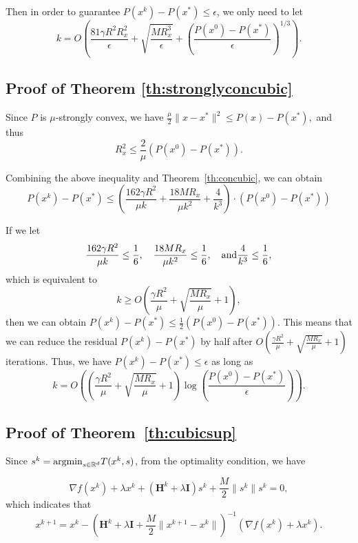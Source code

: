 \documentclass[10pt]{article}
\newcommand{\R}{\mathbb{R}}
\newcommand{\mH}{\mathbf{H}}
\newcommand{\mI}{\mathbf{I}}
\begin{document}
Then in order to guarantee $P(x^k) - P(x^*) \leq \epsilon$, we only need to let 
$$
k = O\left( \frac{81\gamma R^2 R_x^2}{\epsilon}  + \sqrt{\frac{MR_x^3}{\epsilon}} + \left(  \frac{P(x^0) - P(x^*)}{\epsilon}  \right)^{1/3}   \right). 
$$


\subsection{Proof of Theorem \ref{th:stronglyconcubic}}

Since $P$ is $\mu$-strongly convex, we have 
$
\frac{\mu}{2} \|x-x^*\|^2 \leq P(x) - P(x^*), 
$
and thus 
$$
R_x^2 \leq \frac{2}{\mu} (P(x^0) - P(x^*)). 
$$

Combining the above inequality and Theorem~\ref{th:concubic}, we can obtain 
$$
P(x^k) - P(x^*) \leq \left(  \frac{162\gamma R^2}{\mu k} +  \frac{18MR_x}{\mu k^2} + \frac{4}{ k^3}  \right) \cdot \left(  P(x^0) - P(x^*)  \right)
$$

If we let 
$$
\frac{162\gamma R^2}{\mu k} \leq \frac{1}{6}, \quad  \frac{18MR_x}{\mu k^2} \leq \frac{1}{6}, \quad {\rm and} \frac{4}{ k^3}  \leq \frac{1}{6}, 
$$
which is equivalent to 
$$
k \geq O\left(  \frac{\gamma R^2}{\mu} + \sqrt{\frac{MR_x}{\mu}} + 1 \right), 
$$
then we can obtain $P(x^k) - P(x^*) \leq \frac{1}{2} (P(x^0) - P(x^*))$. This means that we can reduce the residual $P(x^k)-P(x^*)$ by half after $O\left(  \frac{\gamma R^2}{\mu} + \sqrt{\frac{MR_x}{\mu}} + 1 \right)$ iterations. Thus, we have $P(x^k) - P(x^*) \leq \epsilon$ as long as 
$$
k = O\left( \left(  \frac{\gamma R^2}{\mu} + \sqrt{\frac{MR_x}{\mu}} + 1 \right) \log \left(  \frac{P(x^0) - P(x^*)}{\epsilon}  \right)   \right). 
$$



\subsection{Proof of Theorem~\ref{th:cubicsup}}

Since $s^k = {\rm argmin}_{s\in\R^d}T(x^k, s)$, from the optimality condition, we have 

$$
\nabla f(x^k) + \lambda x^k + (\mH^k + \lambda \mI)s^k  + \frac{M}{2}\|s^k\| s^k = 0, 
$$
which indicates that 
\begin{equation}\label{eq:xk+1im}
x^{k+1} = x^k - \left(  \mH^k + \lambda \mI + \frac{M}{2}\|x^{k+1} - x^k\| \right)^{-1} \left(  \nabla f(x^k) + \lambda x^k  \right). 
\end{equation}
\end{document}
